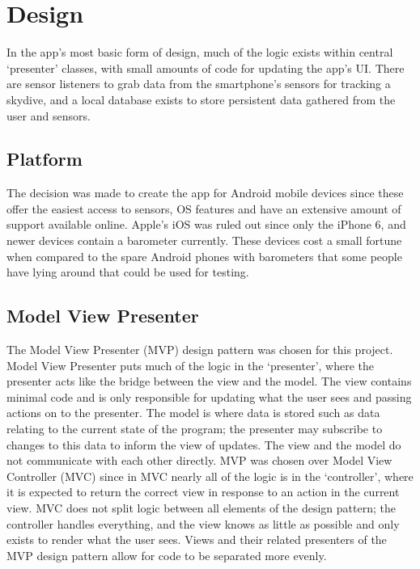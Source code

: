 \section{Design}\label{sec:design} %

In the app's most basic form of design, much of the logic exists within central `presenter' classes, with small amounts of code for updating the app's UI\@. There are sensor listeners to grab data from the smartphone's sensors for tracking a skydive, and a local database exists to store persistent data gathered from the user and sensors.

\subsection{Platform}
The decision was made to create the app for Android mobile devices since these offer the easiest access to sensors, OS features and have an extensive amount of support available online. Apple's iOS was ruled out since only the iPhone 6, and newer devices contain a barometer currently. These devices cost a small fortune when compared to the spare Android phones with barometers that some people have lying around that could be used for testing.

\subsection{Model View Presenter}
The Model View Presenter (MVP) design pattern was chosen for this project. Model View Presenter puts much of the logic in the `presenter', where the presenter acts like the bridge between the view and the model. The view contains minimal code and is only responsible for updating what the user sees and passing actions on to the presenter. The model is where data is stored such as data relating to the current state of the program; the presenter may subscribe to changes to this data to inform the view of updates. The view and the model do not communicate with each other directly. MVP was chosen over Model View Controller (MVC) since in MVC nearly all of the logic is in the `controller', where it is expected to return the correct view in response to an action in the current view. MVC does not split logic between all elements of the design pattern; the controller handles everything, and the view knows as little as possible and only exists to render what the user sees. Views and their related presenters of the MVP design pattern allow for code to be separated more evenly.

